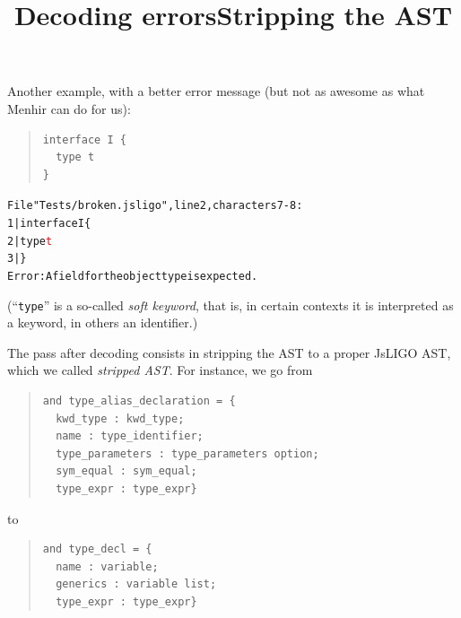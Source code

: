 \documentclass[wide]{slides}
\newcommand{\JsLIGO}[0]{\textsf{JsLIGO}}
\newcommand{\Menhir}[0]{\textsf{Menhir}}
\begin{document}
\begin{slide}
  \title{Decoding errors}

  Another example, with a better error message (but not as awesome as
  what \Menhir{} can do for us):
  \begin{quote}
    \begin{lstlisting}
interface I {
  type t
}
    \end{lstlisting}
  \end{quote}

  \begin{alltt}
    \small
File "Tests/broken.jsligo", line 2, characters 7-8:
  1 | interface I \{
  2 |   type \textcolor{red}{t}
  3 | \}
Error: A field for the object type is expected.
  \end{alltt}

  (``\texttt{type}'' is a so\hyp{}called \emph{soft keyword}, that is,
  in certain contexts it is interpreted as a keyword, in others an
  identifier.)
\end{slide}

\begin{slide}
  \title{Stripping the AST}

  The pass after decoding consists in stripping the AST to a proper
  \JsLIGO{} AST, which we called \emph{stripped AST}. For instance, we
  go from
  \begin{quote}
    \small
    \begin{lstlisting}[language=caml]
and type_alias_declaration = {
  kwd_type : kwd_type;
  name : type_identifier;
  type_parameters : type_parameters option;
  sym_equal : sym_equal;
  type_expr : type_expr}
    \end{lstlisting}
  \end{quote}
  to
  \begin{quote}
    \small
    \begin{lstlisting}[language=caml]
and type_decl = {
  name : variable;
  generics : variable list;
  type_expr : type_expr}
    \end{lstlisting}
  \end{quote}

\end{slide}
\end{document}
